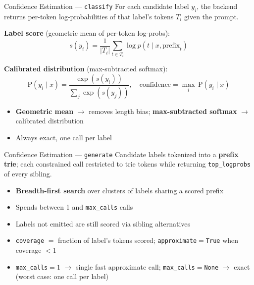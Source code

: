 \documentclass[aspectratio=169,11pt]{beamer}
\begin{document}
\begin{frame}{Confidence Estimation — \texttt{classify}}
  For each candidate label $y_i$, the backend returns per-token
  log-probabilities of that label's tokens $T_i$ given the prompt.

  \vspace{0.2em}
  \textbf{Label score} (geometric mean of per-token log-probs):
  \[
    s(y_i)=\frac{1}{|T_i|}\sum_{t\in T_i}\log p\!\left(t\mid x,\text{prefix}_t\right)
  \]

  \textbf{Calibrated distribution} (max-subtracted softmax):
  \[
    \text{P}(y_i\mid x)=\frac{\exp\!\left(s(y_i)\right)}{\sum_{j}\exp\!\left(s(y_j)\right)},
    \quad \text{confidence}=\max_i\, \text{P}(y_i\mid x)
  \]

  \vspace{-0.3em}
  \begin{itemize}\setlength{\itemsep}{0.1em}
    \item \textbf{Geometric mean} $\to$ removes length bias;
          \textbf{max-subtracted softmax} $\to$ calibrated distribution
    \item Always exact, one call per label
  \end{itemize}
\end{frame}

\begin{frame}{Confidence Estimation — \texttt{generate}}
  Candidate labels tokenized into a \textbf{prefix trie}; each constrained
  call restricted to trie tokens while returning \texttt{top\_logprobs} of
  every sibling.

  \begin{itemize}
    \item \textbf{Breadth-first search} over clusters of labels sharing a
          scored prefix
    \item Spends between 1 and \texttt{max\_calls} calls
    \item Labels not emitted are still scored via sibling alternatives
    \item \texttt{coverage} $=$ fraction of label's tokens scored;
          \texttt{approximate}$=$\texttt{True} when coverage $< 1$
    \item \texttt{max\_calls}$=1$ $\to$ single fast approximate call;
          \texttt{max\_calls}$=$\texttt{None} $\to$ exact (worst case: one
          call per label)
  \end{itemize}
\end{frame}
\end{document}
